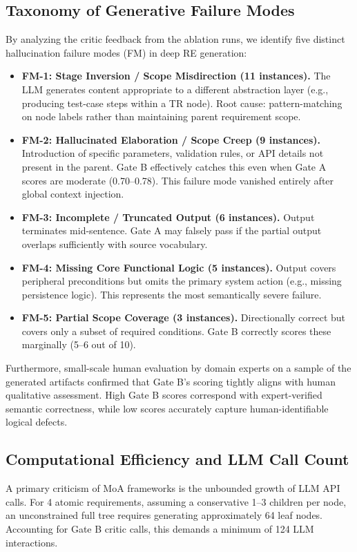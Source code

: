 \documentclass[journal]{IEEEtran}
\begin{document}
\subsection{Taxonomy of Generative Failure Modes}
By analyzing the critic feedback from the ablation runs, we identify five distinct hallucination failure modes (FM) in deep RE generation:
\begin{itemize}
    \item \textbf{FM-1: Stage Inversion / Scope Misdirection (11 instances).} The LLM generates content appropriate to a different abstraction layer (e.g., producing test-case steps within a TR node). Root cause: pattern-matching on node labels rather than maintaining parent requirement scope.
    \item \textbf{FM-2: Hallucinated Elaboration / Scope Creep (9 instances).} Introduction of specific parameters, validation rules, or API details not present in the parent. Gate B effectively catches this even when Gate A scores are moderate (0.70--0.78). This failure mode vanished entirely after global context injection.
    \item \textbf{FM-3: Incomplete / Truncated Output (6 instances).} Output terminates mid-sentence. Gate A may falsely pass if the partial output overlaps sufficiently with source vocabulary.
    \item \textbf{FM-4: Missing Core Functional Logic (5 instances).} Output covers peripheral preconditions but omits the primary system action (e.g., missing persistence logic). This represents the most semantically severe failure.
    \item \textbf{FM-5: Partial Scope Coverage (3 instances).} Directionally correct but covers only a subset of required conditions. Gate B correctly scores these marginally (5--6 out of 10).
\end{itemize}
Furthermore, small-scale human evaluation by domain experts on a sample of the generated artifacts confirmed that Gate B's scoring tightly aligns with human qualitative assessment. High Gate B scores correspond with expert-verified semantic correctness, while low scores accurately capture human-identifiable logical defects.

\subsection{Computational Efficiency and LLM Call Count}
A primary criticism of MoA frameworks is the unbounded growth of LLM API calls. For 4 atomic requirements, assuming a conservative 1--3 children per node, an unconstrained full tree requires generating approximately 64 leaf nodes. Accounting for Gate B critic calls, this demands a minimum of 124 LLM interactions.
\end{document}
